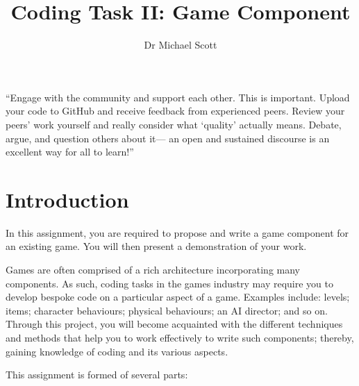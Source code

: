\documentclass{../fal_assignment}
\title{Coding Task II: Game Component}
\author{Dr Michael Scott}
\begin{document}
\maketitle
\begin{marginquote}
    ``Engage with the community and support each other. This is important.
    Upload your code to GitHub and receive feedback from experienced peers.
    Review your peers' work yourself and really consider what `quality' actually means.
    Debate, argue, and question others about it---
    an open and sustained discourse is an excellent way for all to learn!''
\end{marginquote}
\section*{Introduction}

In this assignment, you are required to propose and write a game component for an existing game. You will then present a demonstration of your work.

Games are often comprised of a rich architecture incorporating many components. As such, coding tasks in the games industry may require you to develop bespoke code on a particular aspect of a game. Examples include: levels; items; character behaviours; physical behaviours; an AI director; and so on. Through this project, you will become acquainted with the different techniques and methods that help you to work effectively to write such components; thereby, gaining knowledge of coding and its various aspects.

This assignment is formed of several parts:
\end{document}
